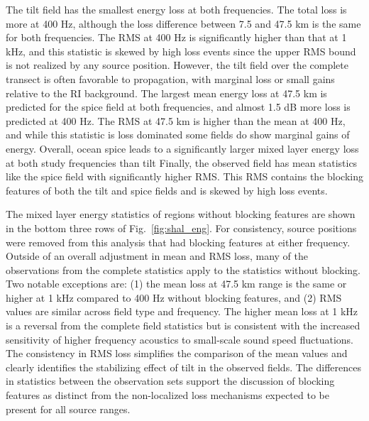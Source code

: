 \documentclass[preprint,NumberedRefs]{JASA}
\begin{document}
The tilt field has the smallest energy loss at both frequencies. The total loss is more at 400 Hz, although the loss difference between 7.5 and 47.5 km is the same for both frequencies. The RMS at 400 Hz is significantly higher than that at 1 kHz, and this statistic is skewed by high loss events since the upper RMS bound is not realized by any source position. However, the tilt field over the complete transect is often favorable to propagation, with marginal loss or small gains relative to the RI background. The largest mean energy loss at 47.5 km is predicted for the spice field at both frequencies, and almost 1.5 dB more loss is predicted at 400 Hz. The RMS at 47.5 km is higher than the mean at 400 Hz, and while this statistic is loss dominated some fields do show marginal gains of energy. Overall, ocean spice leads to a significantly larger mixed layer energy loss at both study frequencies than tilt  Finally, the observed field has mean statistics like the spice field with significantly higher RMS. This RMS contains the blocking features of both the tilt and spice fields and is skewed by high loss events.

The mixed layer energy statistics of regions without blocking features are shown in the bottom three rows of Fig.~\ref{fig:shal_eng}. For consistency, source positions were removed from this analysis that had blocking features at either frequency. Outside of an overall adjustment in mean and RMS loss, many of the observations from the complete statistics apply to the statistics without blocking. Two notable exceptions are: (1) the mean loss at 47.5 km range is the same or higher at 1 kHz compared to 400 Hz without blocking features, and (2) RMS values are similar across field type and frequency. The higher mean loss at 1 kHz is a reversal from the complete field statistics but is consistent with the increased sensitivity of higher frequency acoustics to small-scale sound speed fluctuations. The consistency in RMS loss simplifies the comparison of the mean values and clearly identifies the stabilizing effect of tilt in the observed fields. The differences in statistics between the observation sets support the discussion of blocking features as distinct from the non-localized loss mechanisms expected to be present for all source ranges.
\end{document}
